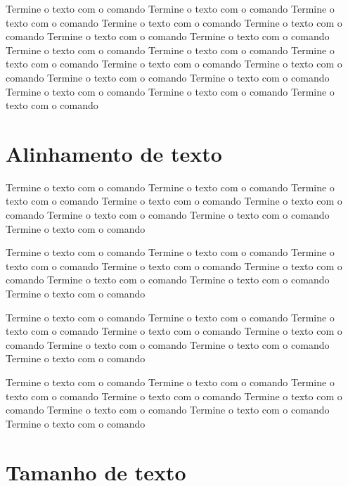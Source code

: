 \documentclass{article}
\begin{document}
\begin{multicols}{2} %
Termine o texto com o comando Termine o texto com o comando
Termine o texto com o comando
Termine o texto com o comando
Termine o texto com o comando
Termine o texto com o comando
Termine o texto com o comando
Termine o texto com o comando
Termine o texto com o comando
Termine o texto com o comando
Termine o texto com o comando
Termine o texto com o comando
Termine o texto com o comando
Termine o texto com o comando
Termine o texto com o comando
Termine o texto com o comando
Termine o texto com o comando
\end{multicols}


\section{Alinhamento de texto}

\begin{center}
Termine o texto com o comando
Termine o texto com o comando
Termine o texto com o comando
Termine o texto com o comando
Termine o texto com o comando
Termine o texto com o comando
Termine o texto com o comando
Termine o texto com o comando    
\end{center}


\begin{flushleft}
Termine o texto com o comando
Termine o texto com o comando
Termine o texto com o comando
Termine o texto com o comando
Termine o texto com o comando
Termine o texto com o comando
Termine o texto com o comando
Termine o texto com o comando
\end{flushleft}


\begin{flushright}
Termine o texto com o comando
Termine o texto com o comando
Termine o texto com o comando
Termine o texto com o comando
Termine o texto com o comando
Termine o texto com o comando
Termine o texto com o comando
Termine o texto com o comando

\end{flushright}


\justifying

Termine o texto com o comando
Termine o texto com o comando
Termine o texto com o comando
Termine o texto com o comando
Termine o texto com o comando
Termine o texto com o comando
Termine o texto com o comando
Termine o texto com o comando



\section{Tamanho de texto}
\end{document}
